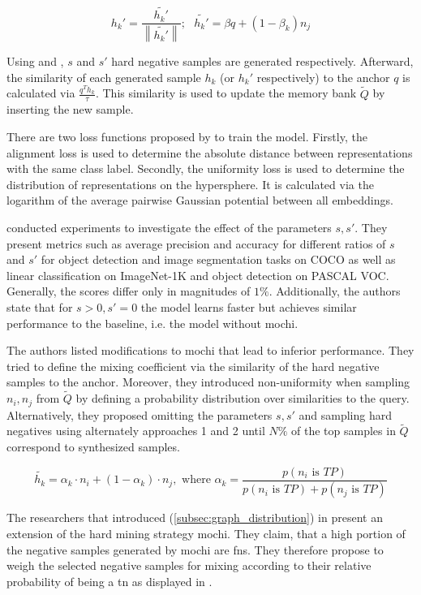 \begin{equation}
    h_k' = \frac{\tilde{h_k'}}{\left\| \tilde{h_k'}  \right\|}; \text{  } \tilde{h_k'} = \beta q + (1-\beta_k)n_j
    \label{eq:mochi_appr2}
\end{equation}

Using  and , 
$s$ and $s'$ hard negative samples are generated respectively.
Afterward, the similarity of each generated sample $h_k$ (or $h_k'$ respectively) 
to the anchor $q$ is calculated via $\frac{q^T h_k}{\tau}$.
This similarity is used to update the memory bank $\tilde{Q}$ 
by inserting the new sample.

There are two loss functions proposed by \citet{mochi_2020} to train the model.
Firstly, the alignment loss is used to determine 
the absolute distance between representations with the same class label.
Secondly, the uniformity loss is used to determine 
the distribution of representations on the hypersphere.
It is calculated via the logarithm of the average pairwise Gaussian potential between all embeddings.

\citet{mochi_2020} conducted experiments to investigate the effect of the parameters $s, s'$.
They present metrics such as average precision and accuracy for different ratios of $s$ and $s'$ 
for object detection and image segmentation tasks on COCO as well as 
linear classification on ImageNet-1K and object detection on PASCAL VOC.
Generally, the scores differ only in magnitudes of $1 \%$.
Additionally, the authors state that for $s > 0, s' = 0$ the model learns faster but achieves similar performance to the baseline, i.e. the model without \ac{mochi}.


The authors listed modifications to \ac{mochi} that lead to inferior performance.
They tried to define the mixing coefficient via the similarity of the hard negative samples 
to the anchor. %
Moreover, they introduced non-uniformity when sampling $n_i, n_j$ from $\tilde{Q}$ by defining a 
probability distribution over similarities to the query. %
Alternatively, they proposed omitting the parameters $s, s'$ and 
sampling hard negatives using alternately approaches 1 and 2 until $N\%$ of the top samples in 
$\tilde{Q}$ correspond to synthesized samples.

\begin{equation}
    \tilde{h_k} =  \alpha_k \cdot n_i + (1-\alpha_k) \cdot  n_j, \text{ where } \alpha_k = \frac{p(n_i \text{ is } TP)}{p(n_i \text{ is } TP) + p(n_j \text{ is } TP)}
    \label{eq:progcl_mix}
\end{equation}

The researchers that introduced \progcl{} (\autoref{subsec:graph_distribution}) in \citet{progcl_2022} 
present an extension of the hard mining strategy \ac{mochi}. %
They claim, that a high portion of the negative samples generated by \ac{mochi} are \acp{fn}.
They therefore propose to weigh the selected negative samples for mixing 
according to their relative probability of being a \ac{tn} as displayed in .